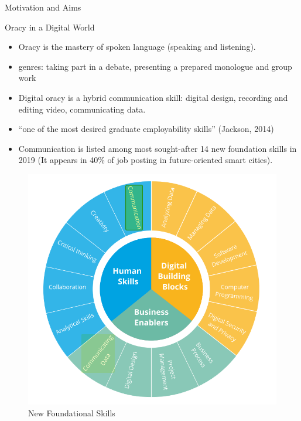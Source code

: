 \documentclass[final]{beamer}
\newlength{\onecolwid}
\begin{document}
\begin{frame}[t]
\begin{columns}[t]
\begin{column}{\onecolwid}
\begin{alertblock}{Motivation and Aims}
\end{alertblock}


\begin{block}{Oracy in a Digital World}

\begin{itemize}
\item Oracy is the mastery of spoken language (speaking and listening).
\item genres: taking part in a debate, presenting a prepared monologue and group work
\item Digital oracy is a hybrid communication skill: digital design, recording and editing video, communicating data.
\item ``one of the most desired graduate employability skills'' (Jackson, 2014)
\item Communication is listed among most sought-after 14 new foundation skills in 2019 (It appears in 40\% of job posting in future-oriented smart cities).
\end{itemize}
\begin{figure}
	\includegraphics[width=0.7\linewidth]{pics/new_skills.png}
	\caption{New Foundational Skills}
\end{figure}

\end{block}



\end{column}
\end{columns}
\end{frame}
\end{document}
